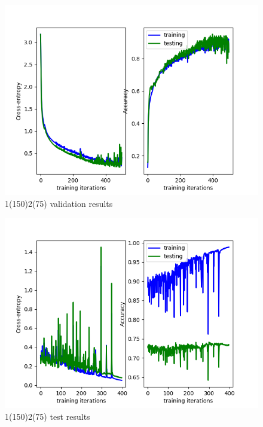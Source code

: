 \documentclass[a4paper]{report}
\begin{document}
\begin{figure}[h]
\begin{center}
\includegraphics[scale=0.5]{15075val.png}
\end{center}
\caption{1(150)2(75) validation results}
\end{figure}
\begin{figure}[h]
\begin{center}
\includegraphics[scale=0.5]{15075test.png}
\end{center}
\caption{1(150)2(75) test results}
\end{figure}
\end{document}
